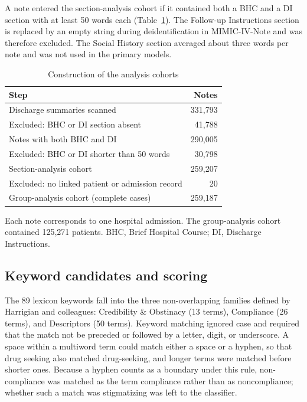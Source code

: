 \documentclass[unnumsec,webpdf,contemporary,large]{oup-authoring-template}
\begin{document}
A note entered the section-analysis cohort if it contained both a BHC and a DI section with at least 50 words each (Table~\ref{tab:s_flow}). The Follow-up Instructions section is replaced by an empty string during deidentification in MIMIC-IV-Note and was therefore excluded. The Social History section averaged about three words per note and was not used in the primary models.

\begin{table}[H]
\caption{Construction of the analysis cohorts}
\label{tab:s_flow}
\centering
\small
\begin{tabular}{lr}
\toprule
Step & Notes \\
\midrule
Discharge summaries scanned & 331,793 \\
\quad Excluded: BHC or DI section absent & 41,788 \\
Notes with both BHC and DI & 290,005 \\
\quad Excluded: BHC or DI shorter than 50 words & 30,798 \\
Section-analysis cohort & 259,207 \\
\quad Excluded: no linked patient or admission record & 20 \\
Group-analysis cohort (complete cases) & 259,187 \\
\bottomrule
\end{tabular}
\begin{tablenotes}
\item Each note corresponds to one hospital admission. The group-analysis cohort contained 125,271 patients. BHC, Brief Hospital Course; DI, Discharge Instructions.
\end{tablenotes}
\end{table}

\subsection{Keyword candidates and scoring}

The 89 lexicon keywords fall into the three non-overlapping families defined by Harrigian and colleagues: Credibility \& Obstinacy (13 terms), Compliance (26 terms), and Descriptors (50 terms). Keyword matching ignored case and required that the match not be preceded or followed by a letter, digit, or underscore. A space within a multiword term could match either a space or a hyphen, so that drug seeking also matched drug-seeking, and longer terms were matched before shorter ones. Because a hyphen counts as a boundary under this rule, non-compliance was matched as the term compliance rather than as noncompliance; whether such a match was stigmatizing was left to the classifier.
\end{document}
